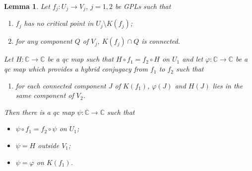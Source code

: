 \documentclass{amsart}
\numberwithin{equation}{section}
\newtheorem{lemma}[theorem]{Lemma}%
\newcommand{\C}{\mathbb C}
\theoremstyle{definition}
\theoremstyle{remark}
\begin{document}
\begin{lemma}\label{lem:connectedJuliasets}
Let $f_j: U_j\to V_j$, $j=1,2$ be GPLs such that
\begin{enumerate}
\item[(1)] $f_j$ has no critical point in $U_j\setminus K(f_j)$;
\item[(2)] for any component $Q$ of $V_j$, $K(f_j)\cap Q$ is connected. 
\end{enumerate}
Let $H:\C\to\C$ be a qc map such that $H\circ f_1=f_2\circ H$ on $U_1$ and let $\varphi:\C\to \C$ be a qc map which provides a hybrid conjugacy from $f_1$ to $f_2$ such that 
\begin{enumerate}
\item[(3)] for each connected component $J$ of $K(f_1)$, $\varphi(J)$ and $H(J)$ lies in the same component of $V_2$. 
\end{enumerate}
Then there is a qc map $\psi:\C\to \C$ such that 
\begin{itemize}
\item $\psi\circ f_1=f_2\circ \psi$ on $U_1$;
\item $\psi=H$ outside $V_1$;
\item $\psi=\varphi$ on $K(f_1)$.
\end{itemize}  
\end{lemma}
\end{document}
